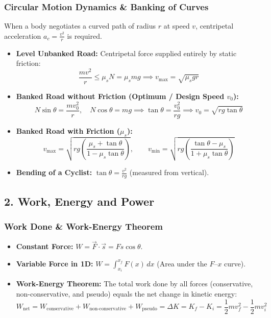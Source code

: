 \documentclass[11pt,a4paper]{article}
\begin{document}
\subsubsection{Circular Motion Dynamics \& Banking of Curves}
When a body negotiates a curved path of radius $r$ at speed $v$, centripetal acceleration $a_c = \frac{v^2}{r}$ is required.
\begin{itemize}[leftmargin=1.5em, itemsep=3pt]
  \item \textbf{Level Unbanked Road:} Centripetal force supplied entirely by static friction:
  \[
    \frac{m v^2}{r} \le \mu_s N = \mu_s mg \implies v_{\text{max}} = \sqrt{\mu_s g r}
  \]
  \item \textbf{Banked Road without Friction (Optimum / Design Speed $v_0$):}
  \[
    N \sin\theta = \frac{m v_0^2}{r}, \quad N \cos\theta = mg \implies \tan \theta = \frac{v_0^2}{r g} \implies v_0 = \sqrt{r g \tan\theta}
  \]
  \item \textbf{Banked Road with Friction ($\mu_s$):}
  \[
    v_{\text{max}} = \sqrt{r g \left(\frac{\mu_s + \tan\theta}{1 - \mu_s \tan\theta}\right)}, \qquad v_{\text{min}} = \sqrt{r g \left(\frac{\tan\theta - \mu_s}{1 + \mu_s \tan\theta}\right)}
  \]
  \item \textbf{Bending of a Cyclist:} $\tan\theta = \frac{v^2}{rg}$ (measured from vertical).
\end{itemize}

\subsection{2. Work, Energy and Power}

\subsubsection{Work Done \& Work-Energy Theorem}
\begin{itemize}[leftmargin=1.5em, itemsep=2pt]
  \item \textbf{Constant Force:} $W = \vec{F} \cdot \vec{s} = F s \cos\theta$.
  \item \textbf{Variable Force in 1D:} $W = \int_{x_i}^{x_f} F(x) \, dx$ (Area under the $F$--$x$ curve).
  \item \textbf{Work-Energy Theorem:} The total work done by all forces (conservative, non-conservative, and pseudo) equals the net change in kinetic energy:
  \[
    W_{\text{net}} = W_{\text{conservative}} + W_{\text{non-conservative}} + W_{\text{pseudo}} = \Delta K = K_f - K_i = \frac{1}{2}m v_f^2 - \frac{1}{2}m v_i^2
  \]
\end{itemize}
\end{document}
